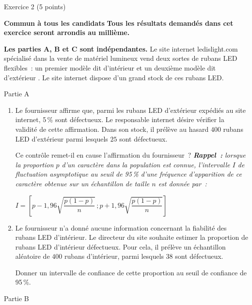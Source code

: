 
\begin{h2}Exercice 2 (5 points)\end{h2}
\textbf{Commun à  tous les candidats}
\medskip
\textbf{Tous les résultats demandés dans cet exercice seront arrondis au millième.}
\par
\textbf{Les parties A, B et C sont indépendantes.}
\medskip
Le site internet \og ledislight.com \fg{} spécialisé dans la vente de matériel lumineux vend deux sortes de rubans LED flexibles~: un premier modèle dit d'\og intérieur \fg{} et un deuxième modèle dit d'\og extérieur \fg{}. Le site internet dispose d'un grand stock de ces rubans LED.
\begin{center}\begin{h3}Partie A \end{h3}\end{center}
\begin{enumerate}
     \item Le fournisseur affirme que, parmi les rubans LED d'extérieur expédiés au site internet, 5\,\% sont défectueux. Le responsable internet désire vérifier la validité de cette affirmation. Dans son stock, il prélève au hasard $400$ rubans LED d'extérieur parmi lesquels $25$ sont défectueux.
     \par
     Ce contrôle remet-il en cause l'affirmation du fournisseur~?
     \medskip
     \emph{\textbf{Rappel~:} lorsque la proportion $p$ d'un caractère dans la population est connue, l'intervalle $I$ de fluctuation asymptotique au seuil de 95\,\% d'une fréquence d'apparition de ce caractère obtenue sur un échantillon de taille $n$ est donnée par~:}
     \begin{center}
     $I= \left [ p-1,96 \sqrt{\dfrac{p(1-p)}{n}}\,;\right.$\nosp$\left.p+1,96 \sqrt{\dfrac{p(1-p)}{n}}\right ]$
\end{center}
\bigskip
\item Le fournisseur n'a donné aucune information concernant la fiabilité des rubans LED d'intérieur. Le directeur du site souhaite estimer la proportion de rubans LED d'intérieur défectueux. Pour cela, il prélève un échantillon aléatoire de $400$ rubans d'intérieur, parmi lesquels $38$ sont défectueux.
\par
Donner un intervalle de confiance de cette proportion au seuil de confiance de 95\,\%.
\end{enumerate}
\begin{center}\begin{h3}Partie B \end{h3}\end{center}
